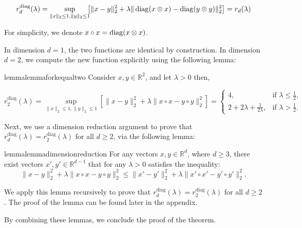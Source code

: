 \begin{align*}
r^{\text{diag}}_d(\lambda) = \sup\limits_{\|x\|_2 \leq 1, \|y\|_2 \leq 1}\!\!\!\big[\|x - y\|_2^2 + \lambda \|\operatorname{\operatorname{diag}}(x \otimes x) - \operatorname{\operatorname{diag}}(y \otimes y)\|_2^2\big] = r_d(\lambda)
\end{align*}

For simplicity, we denote $x \circ x = \operatorname{\operatorname{diag}}(x \otimes x)$.

In dimension $d = 1$, the two functions are identical by construction. In dimension $d = 2$, we compute the new function explicitly using the following lemma:

\begin{restatable}{lemma}{lemmaforkequaltwo}
\label{lem:d=2}
Consider $x, y\in \mathbb{R}^2$, and let $\lambda > 0$ then,

 \begin{equation}
 r_2^{\text{diag}}(\lambda)= \sup_{\|x\|_2 \leq 1, \|y\|_2 \leq 1} \left[\|x - y\|_2^2 + \lambda \|x \circ x - y \circ y\|_2^2\right] = 
 \begin{cases}
     4, & \text{if } \lambda \leq \frac{1}{2},\\
     2 + 2\lambda + \frac{1}{2\lambda}, & \text{if } \lambda > \frac{1}{2}.
 \end{cases}
\end{equation}

\end{restatable}

Next, we use a dimension reduction argument to prove that $r^{\text{diag}}_d(\lambda) = r^{\text{diag}}_2(\lambda)$ for all $d \geq 2$, via the following lemma:

\begin{restatable}{lemma}{lemmadimensionreduction}
    \label{lem:dim_red}
    For any vectors $x, y \in \mathbb{R}^d$, where  $d \ge 3$, there exist vectors $x', y'\in \mathbb{R}^{d - 1}$ that for any $\lambda > 0$ satisfies the inequality:
    \begin{equation*}
    \|x - y\|_2^2 + \lambda \|x \circ x - y \circ y\|_2^2 \le \|x'- y'\|_2^2 + \lambda \|x' \circ x' - y' \circ y'\|_2^2.
    \end{equation*}
    
\end{restatable}
We apply this lemma recursively to prove that $r^{\text{diag}}_d(\lambda) = r^{\text{diag}}_2(\lambda)$ for all $d \geq 2$. The proof of the lemma can be found later in the appendix.

By combining these lemmas, we conclude the proof of the theorem.





